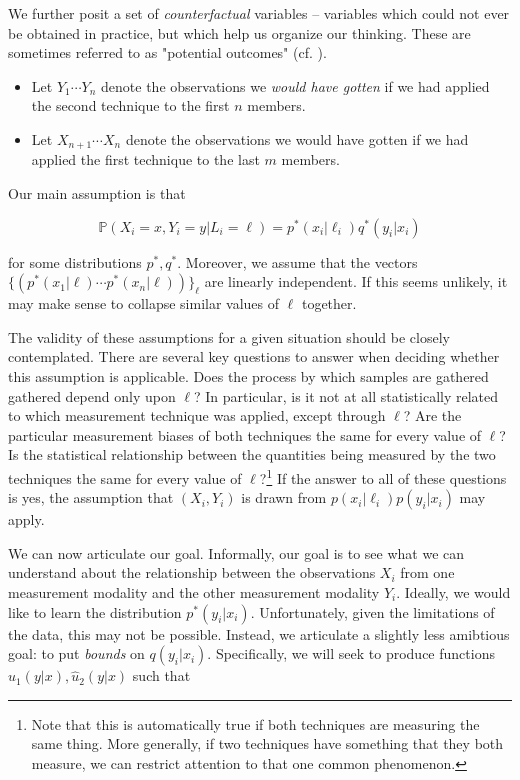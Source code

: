 We further posit a set of \emph{counterfactual} variables -- variables which could not ever be obtained in practice,
but which help us organize our thinking.  These are sometimes referred to as "potential outcomes"  (cf. \cite{rubin2005causal}).

\begin{itemize}
\item Let $Y_1 \cdots Y_n$ denote the observations we \emph{would have gotten} if we had applied the second technique
to the first $n$ members.
\item Let $X_{n+1} \cdots X_n$ denote the observations we would have gotten if we had applied the first technique
to the last $m$ members. 
\end{itemize}

Our main assumption is that 

\begin{equation}
\mathbb{P}(X_i=x,Y_i=y|L_i=\ell)=p^*(x_i|\ell_i)q^*(y_i|x_i)
\end{equation}

for some distributions $p^*,q^*$.  Moreover, we assume that the vectors $\{(p^*(x_1|\ell)\cdots p^*(x_n|\ell))\}_\ell$ 
are linearly independent.  If this seems unlikely, it may make sense to collapse similar values of $\ell$ together.

The validity of these assumptions for a given situation should be closely contemplated.  
There are several key questions to answer
when deciding whether this assumption is applicable.  Does the process by which samples are gathered
gathered depend only upon $\ell$?  In particular, is it not at all statistically related to which measurement technique was 
applied, except through $\ell$?  Are the particular measurement biases of both techniques the same for every value of $\ell$?  
Is the statistical relationship between the quantities being measured by the 
two techniques the same for every value of $\ell$?\footnote{Note that this is 
automatically true if both techniques are measuring the same thing.  More generally, if two techniques have something that
they both measure, we can restrict attention to that one common phenomenon.}  If the answer to all of these questions is yes, the assumption that $(X_i,Y_i)$ is drawn from $p(x_i|\ell_i)p(y_i|x_i)$ may apply.

We can now articulate our goal.  Informally, our goal is to see what we can understand about the relationship between
the observations $X_i$ from one measurement modality and the other measurement modality $Y_i$.  Ideally, we would
like to learn the distribution $p^*(y_i|x_i)$.  Unfortunately, given the limitations of the data, this may not be 
possible.  Instead, we articulate a slightly less amibtious goal: to put \emph{bounds} on $q(y_i|x_i)$.  Specifically,
we will seek to produce functions $\hat u_1(y|x),\hat u_2(y|x)$ such that

